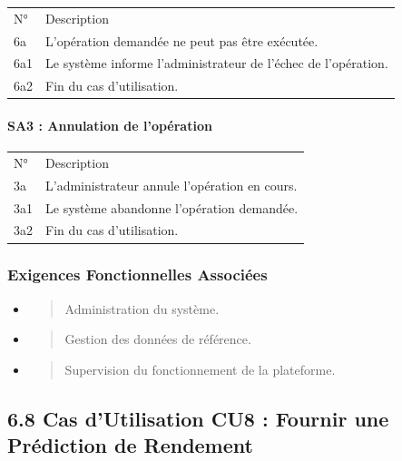 \documentclass[
]{article}
\begin{document}
\begin{longtable}[]{@{}ll@{}}
\toprule
\endhead
N° & Description \\
6a & L'opération demandée ne peut pas être exécutée. \\
6a1 & Le système informe l'administrateur de l'échec de l'opération. \\
6a2 & Fin du cas d'utilisation. \\
\bottomrule
\end{longtable}

\hypertarget{sa3-annulation-de-lopuxe9ration-3}{%
\paragraph{SA3 : Annulation de
l'opération}\label{sa3-annulation-de-lopuxe9ration-3}}

\begin{longtable}[]{@{}ll@{}}
\toprule
\endhead
N° & Description \\
3a & L'administrateur annule l'opération en cours. \\
3a1 & Le système abandonne l'opération demandée. \\
3a2 & Fin du cas d'utilisation. \\
\bottomrule
\end{longtable}

\hypertarget{exigences-fonctionnelles-associuxe9es-6}{%
\subsubsection{Exigences Fonctionnelles
Associées}\label{exigences-fonctionnelles-associuxe9es-6}}

\begin{itemize}
\item
  \begin{quote}
  Administration du système.
  \end{quote}
\item
  \begin{quote}
  Gestion des données de référence.
  \end{quote}
\item
  \begin{quote}
  Supervision du fonctionnement de la plateforme.
  \end{quote}
\end{itemize}

\hypertarget{cas-dutilisation-cu8-fournir-une-pruxe9diction-de-rendement}{%
\subsection{6.8 Cas d'Utilisation CU8 : Fournir une Prédiction de
Rendement}\label{cas-dutilisation-cu8-fournir-une-pruxe9diction-de-rendement}}
\end{document}

